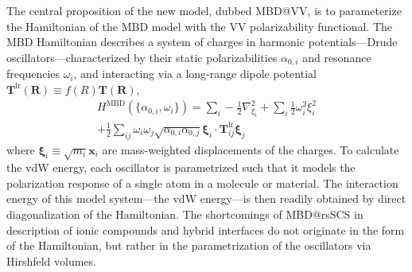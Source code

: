 The central proposition of the new model, dubbed MBD@VV, is to parameterize the Hamiltonian of the MBD model with the VV polarizability functional.
The MBD Hamiltonian describes a system of charges in harmonic potentials---Drude oscillators---characterized by their static polarizabilities $\alpha_{0,i}$ and resonance frequencies $\omega_i$, and interacting via a long-range dipole potential $\mathbf T^\mathrm{lr}(\mathbf R)\equiv f(R)\mathbf T(\mathbf R)$,
\begin{multline}
  H^\text{MBD}(\{\alpha_{0,i},\omega_i\})=\sum_i-\frac12\nabla_{\xi_i}^2+\sum_i\frac12\omega_i^2\xi_i^2 \\
  +\frac12\sum_{ij}\omega_i\omega_j\sqrt{\alpha_{0,i}\alpha_{0,j}}\boldsymbol{\xi}_i\cdot\mathbf T^\mathrm{lr}_{ij}\boldsymbol{\xi}_j
\end{multline}
where $\boldsymbol\xi_i\equiv\sqrt{m_i}\mathbf x_i$ are mass-weighted displacements of the charges.
To calculate the vdW energy, each oscillator is parametrized such that it models the polarization response of a single atom in a molecule or material.
The interaction energy of this model system---the vdW energy---is then readily obtained by direct diagonalization of the Hamiltonian.
The shortcomings of MBD@rsSCS in description of ionic compounds and hybrid interfaces do not originate in the form of the Hamiltonian, but rather in the parametrization of the oscillators via Hirshfeld volumes.

